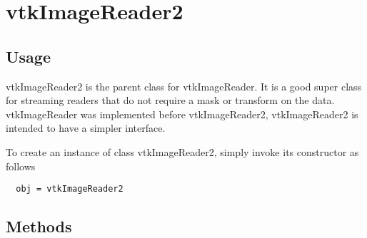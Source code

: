 \section{vtkImageReader2}

\subsection{Usage}

 vtkImageReader2 is the parent class for vtkImageReader.  It 
 is a good super class for streaming readers that do not require
 a mask or transform on the data.  vtkImageReader was implemented
 before vtkImageReader2, vtkImageReader2 is intended to have 
 a simpler interface.

To create an instance of class vtkImageReader2, simply
invoke its constructor as follows
\begin{verbatim}
  obj = vtkImageReader2
\end{verbatim}
\subsection{Methods}

